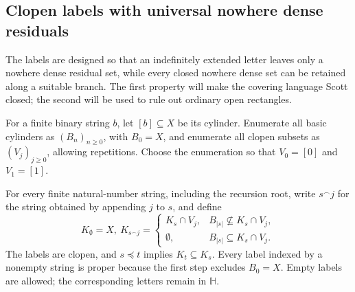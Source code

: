 \documentclass[fleqn,preprint,3p,a4paper]{elsarticle}
\theoremstyle{definition}
\newcommand{\HH}{\mathbb H}
\begin{document}
\subsection{Clopen labels with universal nowhere dense residuals}\label{word:subsec:labels}
The labels are designed so that an indefinitely extended letter leaves only a nowhere dense residual set, while every closed nowhere dense set can be retained along a suitable branch. The first property will make the covering language Scott closed; the second will be used to rule out ordinary open rectangles.

For a finite binary string $b$, let $[b]\subseteq X$ be its cylinder. Enumerate all basic cylinders as $(B_n)_{n\geq0}$, with $B_0=X$, and enumerate all clopen subsets as $(V_j)_{j\geq0}$, allowing repetitions. Choose the enumeration so that $V_0=[0]$ and $V_1=[1]$.

For every finite natural-number string, including the recursion root, write $s^\frown j$ for the string obtained by appending $j$ to $s$, and define
\begin{equation}\label{word:eq:labels}
 K_\emptyset=X,
 ~
 K_{s^\frown j}=\begin{cases}
 K_s\cap V_j,&B_{|s|}\not\subseteq K_s\cap V_j,\\
 \emptyset,&B_{|s|}\subseteq K_s\cap V_j.
 \end{cases}
\end{equation}
The labels are clopen, and $s\preceq t$ implies $K_t\subseteq K_s$. Every label indexed by a nonempty string is proper because the first step excludes $B_0=X$. Empty labels are allowed; the corresponding letters remain in $\HH$.
\end{document}
